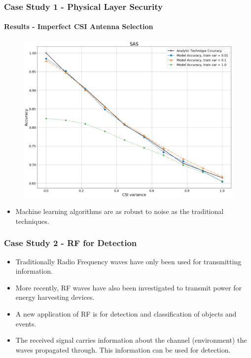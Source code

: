 \documentclass{beamer}
\begin{document}
\begin{frame}
    \frametitle{Case Study 1 - Physical Layer Security}
    \framesubtitle{Results -  Imperfect CSI  Antenna Selection}
    \vspace{-3mm}
    \begin{figure}
        \centering
        \includegraphics[width = 0.7\paperwidth]{./images/csi_sas.png}
    \end{figure}
    \vspace{-6mm}
     \begin{itemize}
         \item Machine learning algorithms are as robust to noise as the traditional techniques.
     \end{itemize}

\end{frame}

\begin{frame}
    \frametitle{Case Study 2 - RF for Detection}
    \begin{itemize}
        \item Traditionally Radio Frequency waves have only been used for transmitting information.
        \item More recently, RF waves have also been investigated to transmit power for energy harvesting devices.  
        \item A new application of RF is for detection and classification of objects and events. 
        \item The received signal carries information about the channel (environment) the waves propagated through. This information can be used for detection.
    \end{itemize}
    
\end{frame}
\end{document}
